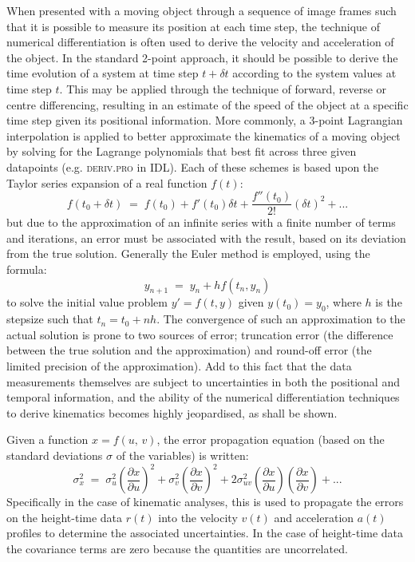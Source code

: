 \documentclass[structabstract]{aa}
\begin{document}
When presented with a moving object through a sequence of image frames such that it is possible to measure its position at each time step, the technique of numerical differentiation is often used to derive the velocity and acceleration of the object. In the standard 2-point approach, it should be possible to derive the time evolution of a system at time step $t+\delta t$ according to the system values at time step $t$. This may be applied through the technique of forward, reverse or centre differencing, resulting in an estimate of the speed of the object at a specific time step given its positional information. More commonly, a 3-point Lagrangian interpolation is applied to better approximate the kinematics of a moving object by solving for the Lagrange polynomials that best fit across three given datapoints (e.g. \textsc{deriv.pro} in IDL). Each of these schemes is based upon the Taylor series expansion of a real function $f(t)$:
\begin{equation}
\label{taylor1}
f(t_0+\delta t) \; = \; f(t_0)+f'(t_0)\delta t +  \frac{f''(t_0)}{2!}(\delta t)^{2}  + ...
\end{equation}
but due to the approximation of an infinite series with a finite number of terms and iterations, an error must be associated with the result, based on its deviation from the true solution. Generally the Euler method is employed, using the formula:
\begin{equation}
y_{n+1} \; = \; y_n + h f(t_n, y_n)
\end{equation}
to solve the initial value problem $y'=f(t,y)$ given $y(t_0)=y_0$, where $h$ is the stepsize such that $t_n=t_0+nh$. The convergence of such an approximation to the actual solution is prone to two sources of error; truncation error (the difference between the true solution and the approximation) and round-off error (the limited precision of the approximation). Add to this fact that the data measurements themselves are subject to uncertainties in both the positional and temporal information, and the ability of the numerical differentiation techniques to derive kinematics becomes highly jeopardised, as shall be shown.

Given a function $x=f(u,\,v)$, the error propagation equation (based on the standard deviations $\sigma$ of the variables) is written:
\begin{equation}
\label{eqn_errorprop}
\sigma_x^2 \; = \; \sigma_u^2 \left(\frac{\partial x}{\partial u}\right) ^2 + \sigma_v^2 \left( \frac{\partial x}{\partial v} \right) ^2 + 2 \sigma_{uv}^2 \left( \frac{\partial x}{\partial u} \right) \left( \frac{\partial x}{\partial v} \right) + ...
\end{equation}
Specifically in the case of kinematic analyses, this is used to propagate the errors on the height-time data $r(t)$ into the velocity $v(t)$ and acceleration $a(t)$ profiles to determine the associated uncertainties. In the case of height-time data the covariance terms are zero because the quantities are uncorrelated.
\end{document}
